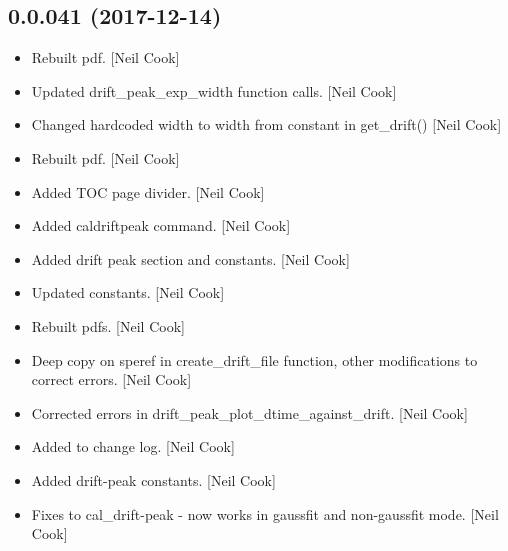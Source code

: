 \documentclass[a4paper,10pt,english]{report}
\begin{document}
\subsection{0.0.041 (2017-12-14)}
\label{\detokenize{misc/changelog:id509}}\begin{itemize}
\item {} 
Rebuilt pdf. {[}Neil Cook{]}

\item {} 
Updated drift\_peak\_exp\_width function calls. {[}Neil Cook{]}

\item {} 
Changed hardcoded width to width from constant in get\_drift() {[}Neil
Cook{]}

\item {} 
Rebuilt pdf. {[}Neil Cook{]}

\item {} 
Added TOC page divider. {[}Neil Cook{]}

\item {} 
Added caldriftpeak command. {[}Neil Cook{]}

\item {} 
Added drift peak section and constants. {[}Neil Cook{]}

\item {} 
Updated constants. {[}Neil Cook{]}

\item {} 
Rebuilt pdfs. {[}Neil Cook{]}

\item {} 
Deep copy on speref in create\_drift\_file function, other modifications
to correct errors. {[}Neil Cook{]}

\item {} 
Corrected errors in drift\_peak\_plot\_dtime\_against\_drift. {[}Neil Cook{]}

\item {} 
Added to change log. {[}Neil Cook{]}

\item {} 
Added drift-peak constants. {[}Neil Cook{]}

\item {} 
Fixes to cal\_drift-peak - now works in gaussfit and non-gaussfit mode.
{[}Neil Cook{]}

\end{itemize}
\end{document}
